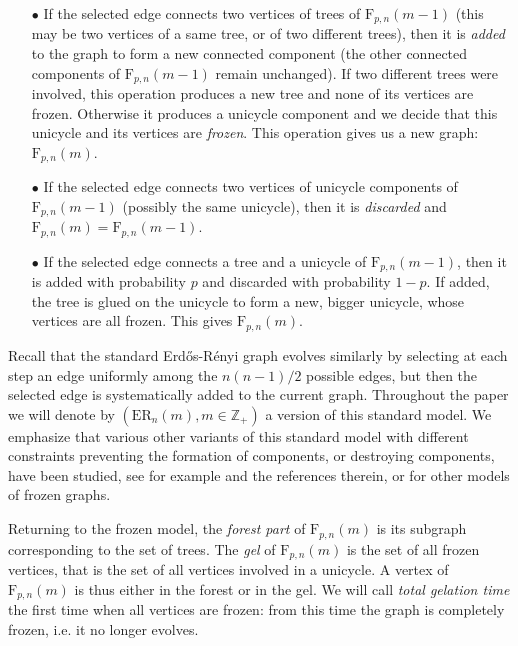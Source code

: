 \documentclass[a4, 11pt]{article}
\numberwithin{equation}{section}
\theoremstyle{plain}
\theoremstyle{definition}
\theoremstyle{remark}
\begin{document}
\begin{center}
\begin{minipage}{15.5cm}
\begin{enumerate}[topsep=-0cm,leftmargin=0.3cm]
\item[$\bullet$] If the selected edge connects two vertices of trees of $\mathrm{F}_{p,n}(m-1)$ (this may be two vertices of a same tree, or of two different trees), then it is \emph{added} to the graph to form a new connected component (the other connected components of $\mathrm{F}_{p,n}(m-1)$ remain unchanged). If two different trees were involved, this operation produces a new tree and none of its vertices are frozen. Otherwise it produces a unicycle component and we decide that this unicycle and its vertices are \emph{frozen}. This operation gives us a new graph: $\mathrm{F}_{p,n}(m)$.
\item[$\bullet$] If the selected edge connects two vertices of unicycle components of $\mathrm{F}_{p,n}(m-1)$ (possibly the same unicycle), then it is \emph{discarded} and $\mathrm{F}_{p,n}(m)=\mathrm{F}_{p,n}(m-1)$.
\item[$\bullet$] If  the selected edge connects a tree and a unicycle of $\mathrm{F}_{p,n}(m-1)$, then it is added with probability $p$ and discarded with probability $1-p$. If added, the tree is glued on the unicycle to form a new, bigger unicycle, whose vertices are all frozen. This gives $\mathrm{F}_{p,n}(m)$.
\end{enumerate}
\end{minipage}
\end{center}
Recall that the standard Erd\H{o}s-R\'enyi graph evolves similarly by selecting at each step an edge uniformly among the $n(n-1)/2$ possible edges, but then the selected edge is systematically added to the current graph. Throughout the paper we will denote by $(\mathrm{ER}_n(m), m\in \mathbb Z_+)$ a version of this standard model. We emphasize that various other variants of this standard model with different constraints preventing the formation of components, or destroying components, have been studied, see for example \cite{BR00, LMP23, RT09, Ross21} and the references therein, or  \cite{Ald00, BBKK23} for other models of frozen graphs. 


Returning to the frozen model, the \emph{forest part} of $\mathrm{F}_{p,n}(m)$ is its subgraph corresponding to the set of trees. The \emph{gel} of $\mathrm{F}_{p,n}(m)$ is the set of all frozen vertices, that is the set of all vertices involved in a unicycle. A vertex of $\mathrm{F}_{p,n}(m)$ is thus either in the forest or in the gel. We will call \emph{total gelation time} the first time when all vertices are frozen: from this time the graph is completely frozen, i.e. it no longer evolves. 
\end{document}

